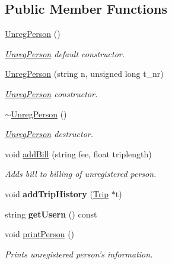 \subsection*{Public Member Functions}
\begin{DoxyCompactItemize}
\item 
\hypertarget{class_unreg_person_aad823e6b15b4ef978f392f3d1714d0ad}{\hyperlink{class_unreg_person_aad823e6b15b4ef978f392f3d1714d0ad}{Unreg\+Person} ()}\label{class_unreg_person_aad823e6b15b4ef978f392f3d1714d0ad}

\begin{DoxyCompactList}\small\item\em \hyperlink{class_unreg_person}{Unreg\+Person} default constructor. \end{DoxyCompactList}\item 
\hyperlink{class_unreg_person_a2e072d7ef58345753feefabf26ae0faa}{Unreg\+Person} (string n, unsigned long t\+\_\+nr)
\begin{DoxyCompactList}\small\item\em \hyperlink{class_unreg_person}{Unreg\+Person} constructor. \end{DoxyCompactList}\item 
\hypertarget{class_unreg_person_a2a82cf4f0c01024b7a68c1d54a4d8ddc}{\hyperlink{class_unreg_person_a2a82cf4f0c01024b7a68c1d54a4d8ddc}{$\sim$\+Unreg\+Person} ()}\label{class_unreg_person_a2a82cf4f0c01024b7a68c1d54a4d8ddc}

\begin{DoxyCompactList}\small\item\em \hyperlink{class_unreg_person}{Unreg\+Person} destructor. \end{DoxyCompactList}\item 
void \hyperlink{class_unreg_person_aca26fc79ba28e05a1311659aea665d91}{add\+Bill} (string fee, float triplength)
\begin{DoxyCompactList}\small\item\em Adds bill to billing of unregistered person. \end{DoxyCompactList}\item 
\hypertarget{class_unreg_person_a72c5a1dff2af67a6b9b8eebb5f063f16}{void {\bfseries add\+Trip\+History} (\hyperlink{class_trip}{Trip} $\ast$t)}\label{class_unreg_person_a72c5a1dff2af67a6b9b8eebb5f063f16}

\item 
\hypertarget{class_unreg_person_a03234c8f6fa2860c4d104586f6d5ac49}{string {\bfseries get\+Usern} () const }\label{class_unreg_person_a03234c8f6fa2860c4d104586f6d5ac49}

\item 
\hypertarget{class_unreg_person_afdf29aaf8d484aa79c5f45f79b966d49}{void \hyperlink{class_unreg_person_afdf29aaf8d484aa79c5f45f79b966d49}{print\+Person} ()}\label{class_unreg_person_afdf29aaf8d484aa79c5f45f79b966d49}

\begin{DoxyCompactList}\small\item\em Prints unregistered person's information. \end{DoxyCompactList}\end{DoxyCompactItemize}
